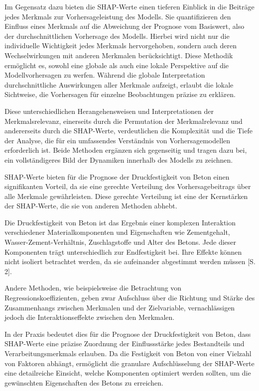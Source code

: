 Im Gegensatz dazu bieten die SHAP-Werte einen tieferen Einblick in die Beiträge jedes Merkmals zur Vorhersageleistung des Modells. 
Sie quantifizieren den Einfluss eines Merkmals auf die Abweichung der Prognose vom Basiswert, also der durchschnittlichen Vorhersage des Modells. 
Hierbei wird nicht nur die individuelle Wichtigkeit jedes Merkmals hervorgehoben, sondern auch deren Wechselwirkungen mit anderen 
Merkmalen berücksichtigt. Diese Methodik ermöglicht es, sowohl eine globale als auch eine lokale Perspektive auf die Modellvorhersagen zu werfen. 
Während die globale Interpretation durchschnittliche Auswirkungen aller Merkmale aufzeigt, erlaubt die lokale Sichtweise, die Vorhersagen 
für einzelne Beobachtungen präzise zu erklären.

Diese unterschiedlichen Herangehensweisen und Interpretationen der Merkmalsrelevanz, einerseits durch die 
Permutation der Merkmalrelevanz und andererseits durch die SHAP-Werte, verdeutlichen die Komplexität und die Tiefe der Analyse, 
die für ein umfassendes Verständnis von Vorhersagemodellen erforderlich ist. Beide Methoden ergänzen sich gegenseitig und tragen dazu bei, 
ein vollständigeres Bild der Dynamiken innerhalb des Modells zu zeichnen.

SHAP-Werte bieten für die Prognose der Druckfestigkeit von Beton einen signifikanten Vorteil, 
da sie eine gerechte Verteilung des Vorhersagebeitrags über alle Merkmale gewährleisten. 
Diese gerechte Verteilung ist eine der Kernstärken der 
SHAP-Werte, die sie von anderen Methoden abhebt.

Die Druckfestigkeit von Beton ist das Ergebnis einer komplexen Interaktion verschiedener 
Materialkomponenten und Eigenschaften wie Zementgehalt, Wasser-Zement-Verhältnis, 
Zuschlagstoffe und Alter des Betons. Jede dieser Komponenten trägt unterschiedlich 
zur Endfestigkeit bei. Ihre Effekte können nicht isoliert betrachtet werden, 
da sie aufeinander abgestimmt werden müssen [S. 2]\cite{Nandhini2021}.

Andere Methoden, wie beispielsweise die Betrachtung von Regressionskoeffizienten, 
geben zwar Aufschluss über die Richtung und Stärke des Zusammenhangs zwischen Merkmalen 
und der Zielvariable, vernachlässigen jedoch die Interaktionseffekte zwischen den Merkmalen.

In der Praxis bedeutet dies für die Prognose der Druckfestigkeit von Beton, 
dass SHAP-Werte eine präzise Zuordnung der Einflussstärke jedes Bestandteils 
und Verarbeitungsmerkmals erlauben. Da die Festigkeit von Beton von einer Vielzahl von 
Faktoren abhängt, ermöglicht die granulare Aufschlüsselung der SHAP-Werte eine 
detailreiche Einsicht, welche Komponenten optimiert werden sollten, um die gewünschten 
Eigenschaften des Betons zu erreichen.

